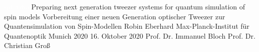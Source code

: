 


\LMUTitle
      {\textcolor{white}{splatzhal}Preparing next generation tweezer systems for quantum simulation of spin models} %
      {Vorbereitung einer neuen Generation optischer Tweezer zur Quantensimulation von Spin-Modellen}%
      {Robin Eberhard}                       %
      {Max-Planck-Institut für Quantenoptik}  %
      {Munich 2020}                           %
      {16. Oktober 2020}                       			 %
      {Prof. Dr. Immanuel Bloch}                  %
      {Prof. Dr. Christian Groß}                    %



\tableofcontents

\cleardoublepage{}


%









\printbibliography


